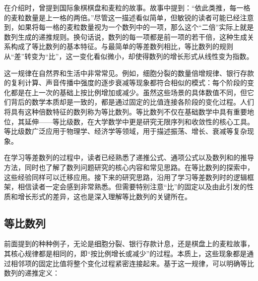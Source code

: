 
\begin{issues}
\issueDraft
\end{issues}


在介绍时，曾提到国际象棋棋盘和麦粒的故事。故事中提到：“依此类推，每一格的麦粒数量是上一格的两倍。”尽管这一描述看似简单，但敏锐的读者可能已经注意到，如果将每一格的麦粒数量视为一个数列中的一项，那么这个“二倍”实际上就是数列生成的递推规则。换句话说，数列的每一项都是前一项的若干倍，这种生成关系构成了等比数列的基本特征。与最简单的等差数列相比，等比数列的规则从“差”转变为“比”，这一变化看似微小，却使得数列的增长形式从线性变为指数。

这一规律在自然界和生活中非常常见。例如，细胞分裂的数量倍增规律、银行存款的复利计算、声音传播中强度的逐步衰减等现象都符合相似的模式：每个阶段的变化都是在上一次的基础上按比例增加或减少。虽然这些场景的具体数值不同，但它们背后的数学本质却是一致的，都是通过固定的比值连接各阶段的变化过程。人们将具有这种倍数特征的数列称为等比数列。等比数列不仅在基础数学中具有重要地位，其延伸——等比级数，在大学数学中更是研究无限序列和收敛性的核心工具。等比级数广泛应用于物理学、经济学等领域，用于描述振荡、增长、衰减等复杂现象。

在学习等差数列的过程中，读者已经熟悉了递推公式、通项公式以及数列和的推导方法，同时也了解了数列问题研究的核心内容和常见思路。在等比数列的探索中，这些经验同样可以迁移应用。接下来的研究思路，沿用了学习等差数列时的逻辑框架，相信读者一定会感到非常熟悉。但需要特别注意“比”的固定以及由此引发的性质和增长形式的差异，这也是深入理解等比数列的关键所在。

\subsection{等比数列}

前面提到的种种例子，无论是细胞分裂、银行存款计息，还是棋盘上的麦粒故事，其核心规律都是相同的，即“按比例增长或减少”的过程。本质上，这些现象都是通过相邻项的固定比值将整个变化过程紧密连接起来。基于这一规律，可以明确等比数列的递推定义：

